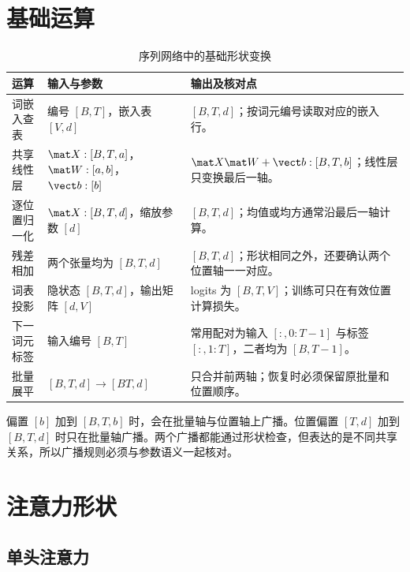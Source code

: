 \documentclass[../textbook.tex]{subfiles}
\begin{document}
\section{基础运算}

\begin{table}[htbp]
\centering
\caption{序列网络中的基础形状变换}\label{tab:appendix-basic-shapes}
\begin{tabularx}{\linewidth}{p{.23\linewidth}p{.31\linewidth}X}
\toprule
运算 & 输入与参数 & 输出及核对点\\\midrule
词嵌入查表 & 编号 $[B,T]$，嵌入表 $[V,d]$ & $[B,T,d]$；按词元编号读取对应的嵌入行。\\
共享线性层 & $\mat X:[B,T,a]$，$\mat W:[a,b]$，$\vect b:[b]$ & $\mat X\mat W+\vect b:[B,T,b]$；线性层只变换最后一轴。\\
逐位置归一化 & $\mat X:[B,T,d]$，缩放参数 $[d]$ & $[B,T,d]$；均值或均方通常沿最后一轴计算。\\
残差相加 & 两个张量均为 $[B,T,d]$ & $[B,T,d]$；形状相同之外，还要确认两个位置轴一一对应。\\
词表投影 & 隐状态 $[B,T,d]$，输出矩阵 $[d,V]$ & logits 为 $[B,T,V]$；训练可只在有效位置计算损失。\\
下一词元标签 & 输入编号 $[B,T]$ & 常用配对为输入 $[:,0:T-1]$ 与标签 $[:,1:T]$，二者均为 $[B,T-1]$。\\
批量展平 & $[B,T,d]\rightarrow[BT,d]$ & 只合并前两轴；恢复时必须保留原批量和位置顺序。\\
\bottomrule
\end{tabularx}
\end{table}

偏置 $[b]$ 加到 $[B,T,b]$ 时，会在批量轴与位置轴上广播。位置偏置 $[T,d]$ 加到 $[B,T,d]$ 时只在批量轴广播。两个广播都能通过形状检查，但表达的是不同共享关系，所以广播规则必须与参数语义一起核对。

\section{注意力形状}

\subsection{单头注意力}
\end{document}
